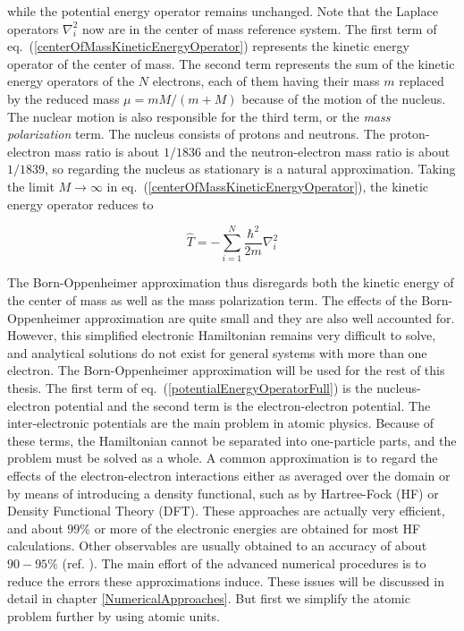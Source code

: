 while the potential energy operator remains unchanged. Note that the
Laplace operators $\nabla^2_i$ now are in the center of mass reference
system.
\newline
%
\newline
The first term of eq.~(\ref{centerOfMassKineticEnergyOperator})
represents the kinetic energy operator of the center of mass. The
second term represents the sum of the kinetic energy operators of the
$N$ electrons, each of them having their mass $m$ replaced by the
reduced mass $\mu = mM/(m+M)$ because of the motion of the
nucleus. The nuclear motion is also responsible for the third term,
or the \emph{mass polarization} term.
\newline
%
\newline
The nucleus consists of protons
and neutrons. The proton-electron mass ratio is about
$1 / 1836$ and the neutron-electron mass ratio is about
$1 / 1839$, so regarding the nucleus as stationary is a natural
approximation. Taking the limit $M\to \infty$ in
eq.~(\ref{centerOfMassKineticEnergyOperator}), the kinetic energy 
operator reduces to

\begin{equation}
  \hat{T} = -\sum_{i=1}^{N}\frac{\hbar^2}{2m}\nabla^2_i
\end{equation}

The Born-Oppenheimer approximation thus disregards both the kinetic
energy of the center of mass as well as the mass polarization term.
The effects of the Born-Oppenheimer approximation are quite small and
they are also well accounted for.
However, this simplified electronic Hamiltonian remains very difficult
to solve, and analytical solutions do not exist for general systems
with more than one electron. The Born-Oppenheimer approximation will
be used for the rest of this thesis.  
\newline
%
\newline
The first term of eq.~(\ref{potentialEnergyOperatorFull}) is the
nucleus-electron potential and the second term is the
electron-electron potential. The inter-electronic potentials are the
main problem in atomic physics. Because of these terms, the
Hamiltonian cannot be separated into one-particle parts, and the
problem must be solved as a whole. A common approximation is to regard
the effects of the electron-electron interactions either as averaged
over the domain or by means of introducing a density functional, such as
by Hartree-Fock (HF) or Density Functional Theory (DFT). These
approaches are actually very efficient, and about $99\%$ or more of
the electronic energies are obtained for most HF calculations.
Other observables are usually obtained to an accuracy of about
$90-95\%$ (ref. \cite{helgaker2002}).  The main effort of the
advanced numerical procedures is to reduce the errors these
approximations induce. These issues will be discussed in detail in
chapter \ref{NumericalApproaches}. But first we simplify the atomic
problem further by using atomic units. 

